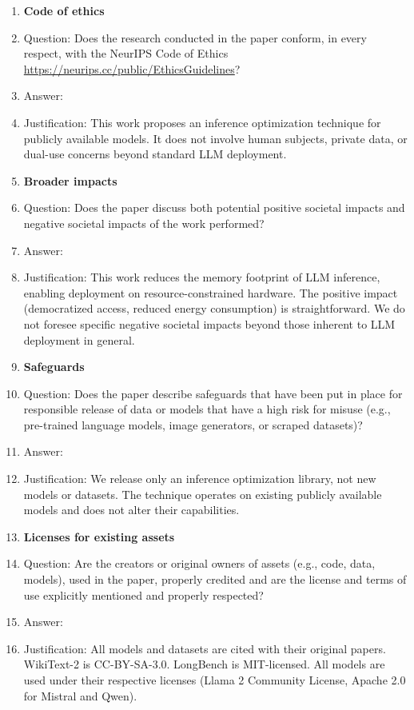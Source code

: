 \begin{enumerate}
\item {\bf Code of ethics}
    \item[] Question: Does the research conducted in the paper conform, in every respect, with the NeurIPS Code of Ethics \url{https://neurips.cc/public/EthicsGuidelines}?
    \item[] Answer: \answerYes{}
    \item[] Justification: This work proposes an inference optimization technique for publicly available models. It does not involve human subjects, private data, or dual-use concerns beyond standard LLM deployment.

\item {\bf Broader impacts}
    \item[] Question: Does the paper discuss both potential positive societal impacts and negative societal impacts of the work performed?
    \item[] Answer: \answerNA{}
    \item[] Justification: This work reduces the memory footprint of LLM inference, enabling deployment on resource-constrained hardware. The positive impact (democratized access, reduced energy consumption) is straightforward. We do not foresee specific negative societal impacts beyond those inherent to LLM deployment in general.

\item {\bf Safeguards}
    \item[] Question: Does the paper describe safeguards that have been put in place for responsible release of data or models that have a high risk for misuse (e.g., pre-trained language models, image generators, or scraped datasets)?
    \item[] Answer: \answerNA{}
    \item[] Justification: We release only an inference optimization library, not new models or datasets. The technique operates on existing publicly available models and does not alter their capabilities.

\item {\bf Licenses for existing assets}
    \item[] Question: Are the creators or original owners of assets (e.g., code, data, models), used in the paper, properly credited and are the license and terms of use explicitly mentioned and properly respected?
    \item[] Answer: \answerYes{}
    \item[] Justification: All models and datasets are cited with their original papers. WikiText-2 is CC-BY-SA-3.0. LongBench is MIT-licensed. All models are used under their respective licenses (Llama 2 Community License, Apache 2.0 for Mistral and Qwen).


\end{enumerate}
